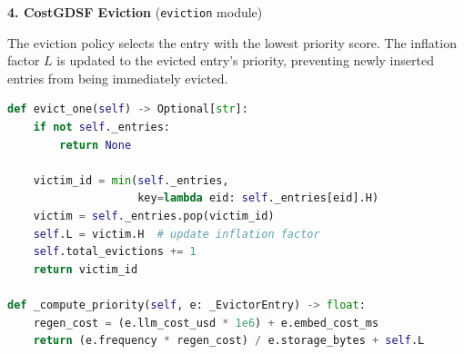 \documentclass[12pt,a4paper]{report}
\begin{document}
\vspace{0.5cm}
\noindent\textbf{4. CostGDSF Eviction} (\texttt{eviction} module)

\noindent The eviction policy selects the entry with the lowest priority score. The inflation factor $L$ is updated to the evicted entry's priority, preventing newly inserted entries from being immediately evicted.

\begin{lstlisting}[language=Python]
def evict_one(self) -> Optional[str]:
    if not self._entries:
        return None

    victim_id = min(self._entries,
                    key=lambda eid: self._entries[eid].H)
    victim = self._entries.pop(victim_id)
    self.L = victim.H  # update inflation factor
    self.total_evictions += 1
    return victim_id

def _compute_priority(self, e: _EvictorEntry) -> float:
    regen_cost = (e.llm_cost_usd * 1e6) + e.embed_cost_ms
    return (e.frequency * regen_cost) / e.storage_bytes + self.L
\end{lstlisting}
\end{document}
